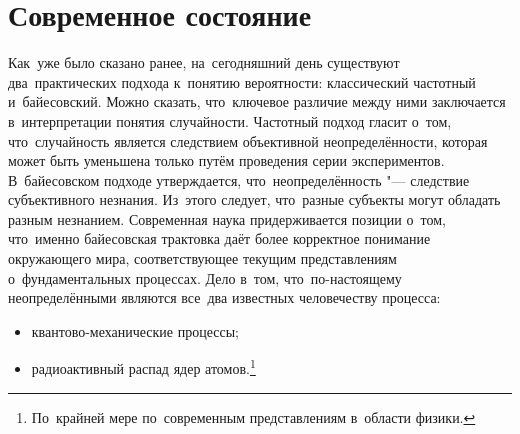 \documentclass[]{scrartcl}
\begin{document}

\section{Современное состояние}
Как~уже было сказано ранее, на~сегодняшний день существуют два~практических подхода к~понятию вероятности: классический частотный и~байесовский. Можно сказать, что~ключевое различие между ними заключается в~интерпретации понятия случайности. Частотный подход гласит о~том, что~случайность является следствием объективной неопределённости, которая может быть уменьшена только путём проведения серии экспериментов. В~байесовском подходе утверждается, что~неопределённость "--- следствие субъективного незнания. Из~этого следует, что~разные субъекты могут обладать разным незнанием. Современная наука придерживается позиции о~том, что~именно байесовская трактовка даёт более корректное понимание окружающего мира, соответствующее текущим представлениям о~фундаментальных процессах. Дело в~том, что~по-настоящему неопределёнными являются все~два известных человечеству процесса:
	\begin{itemize}
		\item квантово-механические процессы;
		\item радиоактивный распад ядер атомов.\footnote{По~крайней мере по~современным представлениям в~области физики.}
	\end{itemize}
\end{document}
